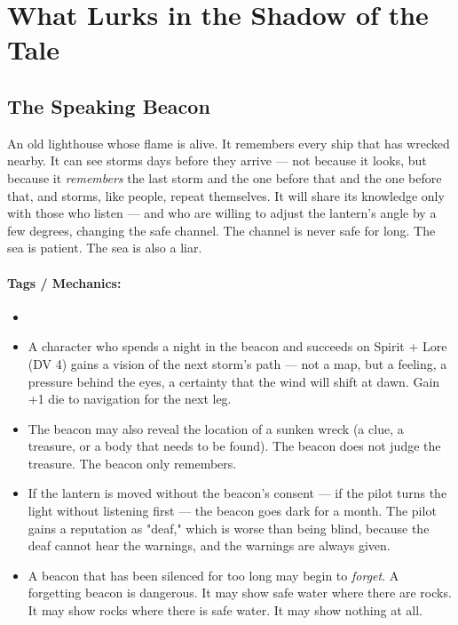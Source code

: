 \section*{What Lurks in the Shadow of the Tale}

\subsection*{The Speaking Beacon}

An old lighthouse whose flame is alive. It remembers every ship that has wrecked nearby. It can see storms days before they arrive — not because it looks, but because it \textit{remembers} the last storm and the one before that and the one before that, and storms, like people, repeat themselves. It will share its knowledge only with those who listen — and who are willing to adjust the lantern's angle by a few degrees, changing the safe channel. The channel is never safe for long. The sea is patient. The sea is also a liar.

\paragraph{Tags / Mechanics:}
\begin{itemize}
\item [KNOWLEDGE] [LOCATION] [TRUTH]
\item A character who spends a night in the beacon and succeeds on Spirit + Lore (DV 4) gains a vision of the next storm's path — not a map, but a feeling, a pressure behind the eyes, a certainty that the wind will shift at dawn. Gain +1 die to navigation for the next leg.
\item The beacon may also reveal the location of a sunken wreck (a clue, a treasure, or a body that needs to be found). The beacon does not judge the treasure. The beacon only remembers.
\item If the lantern is moved without the beacon's consent — if the pilot turns the light without listening first — the beacon goes dark for a month. The pilot gains a reputation as "deaf," which is worse than being blind, because the deaf cannot hear the warnings, and the warnings are always given.
\item A beacon that has been silenced for too long may begin to \textit{forget}. A forgetting beacon is dangerous. It may show safe water where there are rocks. It may show rocks where there is safe water. It may show nothing at all.
\end{itemize}

